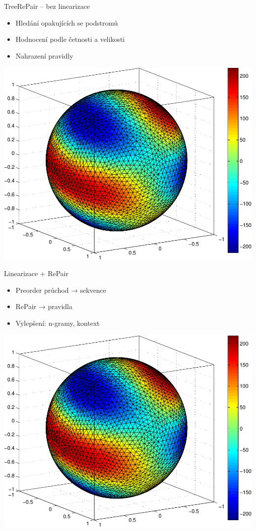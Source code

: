 \documentclass[lualatex,hyperref={pdfencoding=auto}]{beamer}
\begin{document}
\begin{frame}{TreeRePair – bez linearizace}
\begin{itemize}
  \item Hledání opakujících se podstromů
  \item Hodnocení podle četnosti a velikosti
  \item Nahrazení pravidly
\end{itemize}
\includegraphics[width=\textwidth]{fig/sphere_mix_real.pdf}
\end{frame}

\begin{frame}{Linearizace + RePair}
\begin{itemize}
  \item Preorder průchod → sekvence
  \item RePair → pravidla
  \item Vylepšení: n-gramy, kontext
\end{itemize}
\includegraphics[width=\textwidth]{fig/sphere_mix_real.pdf}
\end{frame}
\end{document}
